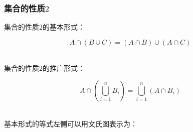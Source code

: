 \documentclass[UTF8]{ctexart}
\begin{document}
\subsubsection{集合的性质$2$}
    集合的性质$2$的基本形式：
    \begin{large}
        \begin{equation*}
            A\cap(B\cup C)=(A\cap B)\cup(A\cap C)
        \end{equation*}
    \end{large}\\
    集合的性质$2$的推广形式：
    \begin{large}
        \begin{equation*}
            A\cap\left(\bigcup_{i=1}^n B_i\right)=\bigcup_{i=1}^n(A\cap B_i)
        \end{equation*}
    \end{large}\\[5mm]
    基本形式的等式左侧可以用文氏图表示为：\vspace{5pt}
\end{document}
